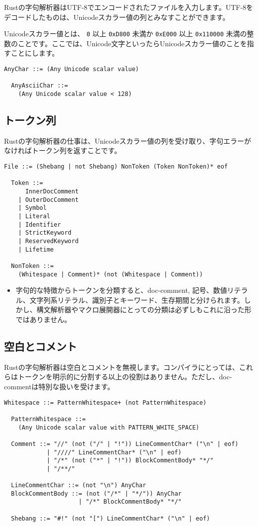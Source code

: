 \documentclass[dvipdfmx,uplatex,papersize,a4paper,10pt]{jsbook}
\theoremstyle{definition}
\begin{document}
Rustの字句解析器はUTF-8でエンコードされたファイルを入力します。UTF-8をデコードしたものは、Unicodeスカラー値の列とみなすことができます。

Unicodeスカラー値とは、 \verb|0| 以上 \verb|0xD800| 未満か \verb|0xE000| 以上 \verb|0x110000| 未満の整数のことです。ここでは、Unicode文字といったらUnicodeスカラー値のことを指すことにします。

\begin{lstlisting}[gobble=2]
  AnyChar ::= (Any Unicode scalar value)

  AnyAsciiChar ::=
    (Any Unicode scalar value < 128)
\end{lstlisting}

\subsection{トークン列}

Rustの字句解析器の仕事は、Unicodeスカラー値の列を受け取り、字句エラーがなければトークン列を返すことです。

\begin{lstlisting}[gobble=2]
  File ::= (Shebang | not Shebang) NonToken (Token NonToken)* eof

  Token ::=
      InnerDocComment
    | OuterDocComment
    | Symbol
    | Literal
    | Identifier
    | StrictKeyword
    | ReservedKeyword
    | Lifetime

  NonToken ::=
    (Whitespace | Comment)* (not (Whitespace | Comment))
\end{lstlisting}

\begin{itemize}
  \item 字句的な特徴からトークンを分類すると、doc-comment, 記号、数値リテラル、文字列系リテラル、識別子とキーワード、生存期間と分けられます。しかし、構文解析器やマクロ展開器にとっての分類は必ずしもこれに沿った形ではありません。
\end{itemize}

\subsection{空白とコメント}

Rustの字句解析器は空白とコメントを無視します。コンパイラにとっては、これらはトークンを明示的に分割する以上の役割はありません。ただし、doc-commentは特別な扱いを受けます。

\begin{lstlisting}[gobble=2]
  Whitespace ::= PatternWhitespace+ (not PatternWhitespace)

  PatternWhitespace ::=
    (Any Unicode scalar value with PATTERN_WHITE_SPACE)

  Comment ::= "//" (not ("/" | "!")) LineCommentChar* ("\n" | eof)
            | "////" LineCommentChar* ("\n" | eof)
            | "/*" (not ("*" | "!")) BlockCommentBody* "*/"
            | "/**/"

  LineCommentChar ::= (not "\n") AnyChar
  BlockCommentBody ::= (not ("/*" | "*/")) AnyChar
                     | "/*" BlockCommentBody* "*/"

  Shebang ::= "#!" (not "[") LineCommentChar* ("\n" | eof)
\end{lstlisting}
\end{document}
